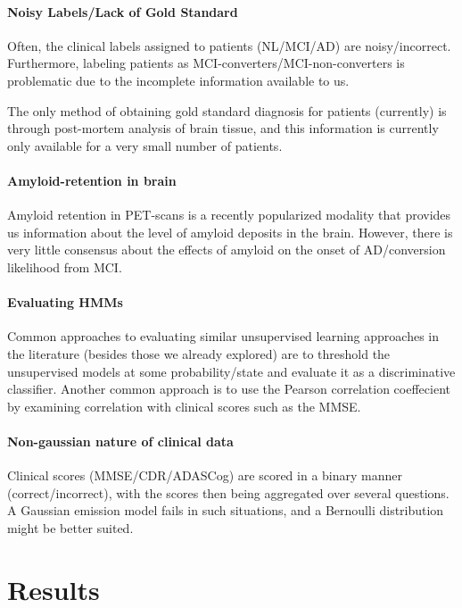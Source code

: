 \documentclass[12pt,a4paper]{article}
\begin{document}
\paragraph{Noisy Labels/Lack of Gold Standard}

Often, the clinical labels assigned to patients (NL/MCI/AD) are
noisy/incorrect. Furthermore, labeling patients as
MCI-converters/MCI-non-converters is problematic due to the incomplete
information available to us. 

The only method of obtaining gold standard diagnosis for patients
(currently) is through post-mortem analysis of brain tissue, and this
information is currently only available for a very small number of
patients.

\paragraph{Amyloid-retention in brain}

Amyloid retention in PET-scans is a recently popularized modality that
provides us information about the level of amyloid deposits in the
brain. However, there is very little consensus about the effects of
amyloid on the onset of AD/conversion likelihood from MCI.

\paragraph{Evaluating HMMs}

Common approaches to evaluating similar unsupervised learning
approaches in the literature (besides those we already explored) are
to threshold the unsupervised models at some probability/state and
evaluate it as a discriminative classifier. Another common approach is
to use the Pearson correlation coeffecient by examining correlation
with clinical scores such as the MMSE.

\paragraph{Non-gaussian nature of clinical data}

Clinical scores (MMSE/CDR/ADAS\-Cog) are scored in a
binary manner (correct/incorrect), with the scores then being
aggregated over several questions. A Gaussian emission model fails in
such situations, and a Bernoulli distribution might be better suited.

\section{Results}
\label{sec:results}
\end{document}
